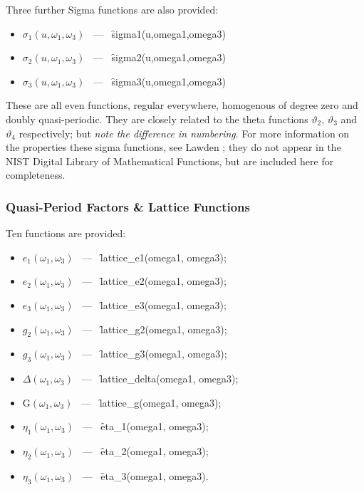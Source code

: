 Three further Sigma functions are also provided:
  
\begin{itemize}
\item $\sigma_1(u, \omega_1, \omega_3)$ \ --- \ \f{sigma1(u,omega1,omega3)}
\item $\sigma_2(u, \omega_1, \omega_3)$ \ --- \ \f{sigma2(u,omega1,omega3)}
\item $\sigma_3(u, \omega_1, \omega_3)$ \ --- \ \f{sigma3(u,omega1,omega3)}
\end{itemize}
These are all even functions, regular everywhere, homogenous of degree zero and doubly quasi-periodic. They are closely related to the
theta functions $\vartheta_2$, $\vartheta_3$ and $\vartheta_4$ respectively; but \emph{note the difference in numbering}.
For more information on the properties these sigma functions, see Lawden \cite{Lawden:89};
they do not appear in the NIST Digital Library of Mathematical Functions, but are included here for completeness.

\subsubsection{ Quasi-Period Factors \& Lattice Functions}
\hypertarget{ETA}{}

Ten functions are provided:
\begin{itemize}
\item $e_1(\omega_1, \omega_3)$ \ --- \ \f{lattice\_e1(omega1, omega3)};
\item $e_2(\omega_1, \omega_3)$ \ --- \ \f{lattice\_e2(omega1, omega3)};
\item $e_3(\omega_1, \omega_3)$ \ --- \ \f{lattice\_e3(omega1, omega3)};
\item $g_2(\omega_1, \omega_3)$ \ --- \ \f{lattice\_g2(omega1, omega3)};
\item $g_3(\omega_1, \omega_3)$ \ --- \ \f{lattice\_g3(omega1, omega3)};
\item $\Delta(\omega_1, \omega_3)$ \ --- \ \f{lattice\_delta(omega1, omega3)};
\item $\mathrm{G}(\omega_1, \omega_3)$ \ --- \ \f{lattice\_g(omega1, omega3)};
\item $\eta_1(\omega_1, \omega_3)$ \ --- \ \f{eta\_1(omega1, omega3)};
\item $\eta_2(\omega_1, \omega_3)$ \ --- \ \f{eta\_2(omega1, omega3)};
\item $\eta_3(\omega_1, \omega_3)$ \ --- \ \f{eta\_3(omega1, omega3)}.
\end{itemize}

